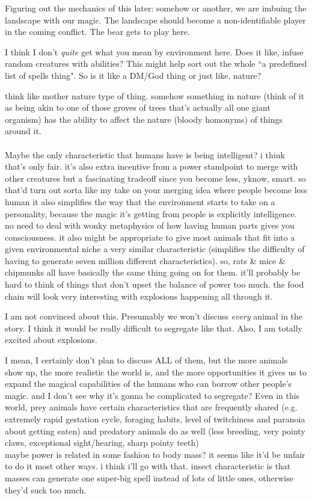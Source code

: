 Figuring out the mechanics of this later: somehow or another, we are imbuing the
landscape with our magic.  The landscape should become a non-identifiable player
in the coming conflict. The bear gets to play here. 

\A I think I don't \textit{quite} get what you mean by environment here. Does it
like, infuse random creatures with abilities? This might help sort out the whole
``a predefined list of spells thing". So is it like a DM/God thing or just like,
nature? 

\R think like mother nature type of thing.  somehow something in nature (think
of it as being akin to one of those groves of trees that's actually all one
giant organism) has the ability to affect the nature (bloody homonyms) of things
around it. \\ \\

Maybe the only characteristic that humans have is being intelligent? i think
that's only fair. it's also extra incentive from a power standpoint to merge
with other creatures but a fascinating tradeoff since you become less, yknow,
smart. so that'd turn out sorta like my take on your merging idea where people
become less human it also simplifies the way that the environment starts to take
on a personality, because the magic it's getting from people is explicitly
intelligence. no need to deal with wonky metaphysics of how having human parts
gives you consciousness.  it also might be appropriate to give most animals that
fit into a given environmental niche a very similar characteristic (simplifies
the difficulty of having to generate seven million different characteristics).
so, rats \& mice \& chipmunks all have basically the same thing going on for them.
it'll probably be hard to think of things that don't upset the balance of power
too much. the food chain will look very interesting with explosions happening
all through it. 

\A I am not convinced about this. Presumably we won't discuss \textit{every}
animal in the story. I think it would be really difficult to segregate like
that. Also, I am totally excited about explosions.

\R I mean, I certainly don't plan to discuss ALL of them, but the more animals
show up, the more realistic the world is, and the more opportunities it gives us
to expand the magical capabilities of the humans who can borrow other people's
magic. and I don't see why it's gonna be complicated to segregate? Even in this
world, prey animals have certain characteristics that are frequently shared
(e.g. extremely rapid gestation cycle, foraging habits, level of twitchiness and
paranoia about getting eaten) and predatory animals do as well (less breeding,
very pointy claws, exceptional sight/hearing, sharp pointy teeth) \\ maybe power
is related in some fashion to body mass? it seems like it'd be unfair to do it
most other ways. i think i'll go with that. insect characteristic is that masses
can generate one super-big spell instead of lots of little ones, otherwise
they'd suck too much.

